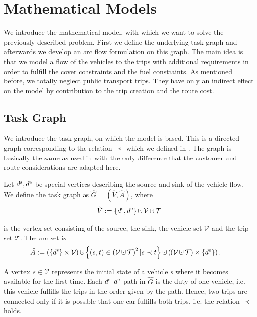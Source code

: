 \chapter{Mathematical Models}

We introduce the mathematical model, with which we want to solve the previously described problem. First we define the underlying task graph and afterwards we develop an arc flow formulation on this graph. The main idea is that we model a flow of the vehicles to the trips with additional requirements in order to fulfill the cover constraints and the fuel constraints. As mentioned before, we totally neglect public transport trips. They have only an indirect effect on the model by contribution to the trip creation and the route cost.

\section{Task Graph}

We introduce the task graph, on which the model is based. This is a directed graph corresponding to the relation $\prec$ which we defined in . The graph is basically the same as used in \cite{Kaiser_Knoll} with the only difference that the customer and route considerations are adapted here.

\begin{definition}
\label{def:taskgraph}

Let $d^{\operatorname{s}},d^{\operatorname{e}}$ be special vertices describing the source and sink of the vehicle flow. We define the task graph as $\hat{G}=(\hat{V},\hat{A})$, where
\begin{align*}
	\hat{V}:=\left\{\ds,\de\right\}\cupdot\mathcal{V}\cupdot\mathcal{T}
\end{align*}

is the vertex set consisting of the source, the sink, the vehicle set $\mathcal{V}$ and the trip set $\mathcal{T}$. The arc set is
\begin{align*}
	\hat{A} & :=\left(\left\{\ds\right\}\times\mathcal{V}\right)\cupdot\left\{(s,t)\in\left(\mathcal{V}\cupdot\mathcal{T}\right)^2|s\prec t\right\}\cupdot\left(\left(\mathcal{V}\cupdot\mathcal{T}\right)\times\left\{\de\right\}\right).
\end{align*}

\end{definition}

A vertex $s\in\mathcal{V}$ represents the initial state of a vehicle $s$ where it becomes available for the first time. Each $d^{\operatorname{s}}$-$d^{\operatorname{e}}$-path in $\hat{G}$ is the duty of one vehicle, i.e. this vehicle fulfills the trips in the order given by the path. Hence, two trips are connected only if it is possible that one car fulfills both trips, i.e. the relation $\prec$ holds.

